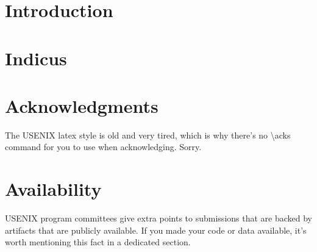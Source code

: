 \section{Introduction}







\section{Indicus}






















\section*{Acknowledgments}

The USENIX latex style is old and very tired, which is why
there's no \textbackslash{}acks command for you to use when
acknowledging. Sorry.

\section*{Availability}

USENIX program committees give extra points to submissions that are
backed by artifacts that are publicly available. If you made your code
or data available, it's worth mentioning this fact in a dedicated
section.







